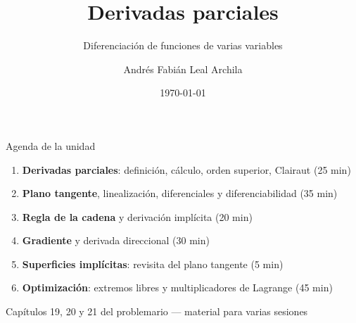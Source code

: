 \documentclass[11pt,aspectratio=169]{beamer}
\title{Derivadas parciales}
\subtitle{Diferenciación de funciones de varias variables}
\author{Andrés Fabián Leal Archila}
\institute{Cálculo III (Multivariable) --- Cód. 20254}
\date{\today}
\begin{document}
\portada

\begin{frame}{Agenda de la unidad}
  \begin{enumerate}
    \setlength{\itemsep}{6pt}
    \item \textbf{Derivadas parciales}: definición, cálculo, orden superior, Clairaut \hfill{\small\color{gray60}(25 min)}
    \item \textbf{Plano tangente}, linealización, diferenciales y diferenciabilidad \hfill{\small\color{gray60}(35 min)}
    \item \textbf{Regla de la cadena} y derivación implícita \hfill{\small\color{gray60}(20 min)}
    \item \textbf{Gradiente} y derivada direccional \hfill{\small\color{gray60}(30 min)}
    \item \textbf{Superficies implícitas}: revisita del plano tangente \hfill{\small\color{gray60}(5 min)}
    \item \textbf{Optimización}: extremos libres y multiplicadores de Lagrange \hfill{\small\color{gray60}(45 min)}
  \end{enumerate}
  \vfill
  \begin{center}
    \small\color{gray60} Capítulos 19, 20 y 21 del problemario --- material para varias sesiones
  \end{center}
\end{frame}
\end{document}

